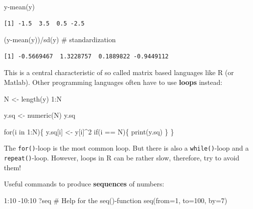\documentclass[
  letterpaper,
  DIV=11,
  numbers=noendperiod]{scrreprt}
\newenvironment{Shaded}{\begin{snugshade}}{\end{snugshade}}
\newcommand{\AttributeTok}[1]{\textcolor[rgb]{0.40,0.45,0.13}{#1}}
\newcommand{\CommentTok}[1]{\textcolor[rgb]{0.37,0.37,0.37}{#1}}
\newcommand{\ControlFlowTok}[1]{\textcolor[rgb]{0.00,0.23,0.31}{#1}}
\newcommand{\DecValTok}[1]{\textcolor[rgb]{0.68,0.00,0.00}{#1}}
\newcommand{\FunctionTok}[1]{\textcolor[rgb]{0.28,0.35,0.67}{#1}}
\newcommand{\NormalTok}[1]{\textcolor[rgb]{0.00,0.23,0.31}{#1}}
\newcommand{\OtherTok}[1]{\textcolor[rgb]{0.00,0.23,0.31}{#1}}
\newcommand{\SpecialCharTok}[1]{\textcolor[rgb]{0.37,0.37,0.37}{#1}}
\theoremstyle{definition}
\theoremstyle{plain}
\theoremstyle{plain}
\theoremstyle{remark}
\begin{document}
\begin{Shaded}
\begin{Highlighting}[]
\NormalTok{y}\SpecialCharTok{{-}}\FunctionTok{mean}\NormalTok{(y)}
\end{Highlighting}
\end{Shaded}

\begin{verbatim}
[1] -1.5  3.5  0.5 -2.5
\end{verbatim}

\begin{Shaded}
\begin{Highlighting}[]
\NormalTok{(y}\SpecialCharTok{{-}}\FunctionTok{mean}\NormalTok{(y))}\SpecialCharTok{/}\FunctionTok{sd}\NormalTok{(y) }\CommentTok{\# standardization }
\end{Highlighting}
\end{Shaded}

\begin{verbatim}
[1] -0.5669467  1.3228757  0.1889822 -0.9449112
\end{verbatim}

This is a central characteristic of so called matrix based languages
like R (or Matlab). Other programming languages often have to use
\textbf{loops} instead:

\begin{Shaded}
\begin{Highlighting}[]
\NormalTok{N }\OtherTok{\textless{}{-}} \FunctionTok{length}\NormalTok{(y)}
\DecValTok{1}\SpecialCharTok{:}\NormalTok{N}

\NormalTok{y.sq }\OtherTok{\textless{}{-}} \FunctionTok{numeric}\NormalTok{(N)}
\NormalTok{y.sq}

\ControlFlowTok{for}\NormalTok{(i }\ControlFlowTok{in} \DecValTok{1}\SpecialCharTok{:}\NormalTok{N)\{}
\NormalTok{  y.sq[i] }\OtherTok{\textless{}{-}}\NormalTok{ y[i]}\SpecialCharTok{\^{}}\DecValTok{2}
  \ControlFlowTok{if}\NormalTok{(i }\SpecialCharTok{==}\NormalTok{ N)\{}
    \FunctionTok{print}\NormalTok{(y.sq)}
\NormalTok{  \}}
\NormalTok{\}}
\end{Highlighting}
\end{Shaded}

The \texttt{for()}-loop is the most common loop. But there is also a
\texttt{while()}-loop and a \texttt{repeat()}-loop. However, loops in R
can be rather slow, therefore, try to avoid them!

Useful commands to produce \textbf{sequences} of numbers:

\begin{Shaded}
\begin{Highlighting}[]
\DecValTok{1}\SpecialCharTok{:}\DecValTok{10}
\SpecialCharTok{{-}}\DecValTok{10}\SpecialCharTok{:}\DecValTok{10}
\NormalTok{?seq }\CommentTok{\# Help for the seq(){-}function}
\FunctionTok{seq}\NormalTok{(}\AttributeTok{from=}\DecValTok{1}\NormalTok{, }\AttributeTok{to=}\DecValTok{100}\NormalTok{, }\AttributeTok{by=}\DecValTok{7}\NormalTok{)}
\end{Highlighting}
\end{Shaded}
\end{document}
